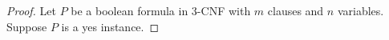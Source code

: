 \begin{proof}

Let $P$ be a boolean formula in 3-CNF with $m$ clauses and $n$ variables.   Suppose $P$ is a yes 
instance.  





\end{proof}
